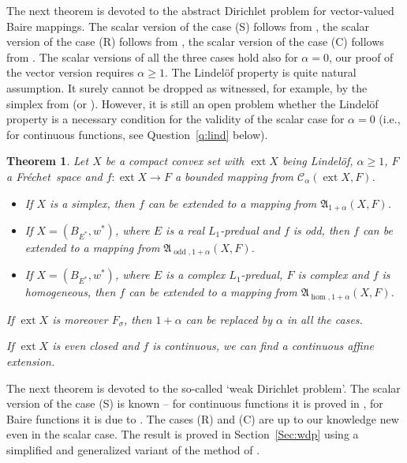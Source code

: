 \documentclass{amsart}
\numberwithin{equation}{section}
\newtheorem{thm}{Theorem}[section]
\theoremstyle{definition}
\def\fra{\mathfrak{A}}
\def\C{\mathcal C}
\def \ext {\operatorname{ext}}
\def\hom{\operatorname{hom}}
\def\odd{\operatorname{odd}}
\newcommand{\fr}{Fr\'echet\ }
\begin{document}
The next theorem is devoted to the abstract Dirichlet problem for vector-valued Baire mappings.
The scalar version of the case (S) follows from \cite{Jel}, the scalar version of the case (R) follows from \cite[Theorem 2.14]{lusp23}, the scalar version of the case (C) follows from \cite[Theorem 2.22]{lusp-complex}. The scalar versions of all the three cases hold also for $\alpha=0$, our proof of the vector version requires $\alpha\ge1$. The Lindel\"of property is quite natural assumption. It surely cannot be dropped as witnessed, for example, by the simplex from \cite[Proposition I.4.15]{alfsen} (or \cite[Example 3.82]{lmns}). However, it is still an open problem whether the Lindel\"of property is
a necessary condition for the validity of the scalar case for $\alpha=0$ (i.e., for continuous functions, see Question~\ref{q:lind} below).


\begin{thm}\label{T:dirichlet} Let $X$ be a compact convex set with $\ext X$ being Lindel\"of, $\alpha\ge 1$, $F$ a \fr space and $f:\ext X\to F$ a bounded mapping from $\C_\alpha(\ext X,F)$.
\begin{itemize}
	\item[(S)] If $X$ is a simplex, then $f$ can be extended to a mapping from $\fra_{1+\alpha}(X,F)$.
	\item[(R)] If $X=(B_{E^*},w^*)$, where $E$ is a real $L_1$-predual and $f$ is odd, then $f$ can be extended to a  mapping from $\fra_{\odd,1+\alpha}(X,F)$.
		\item[(C)] If $X=(B_{E^*},w^*)$, where $E$ is a complex $L_1$-predual, $F$ is complex and $f$ is homogeneous, then $f$ can be extended to a  mapping from $\fra_{\hom,1+\alpha}(X,F)$.
\end{itemize}

If $\ext X$ is moreover $F_\sigma$, then $1+\alpha$ can be replaced by $\alpha$ in all the cases.

If $\ext X$ is even closed and $f$ is continuous, we can find a continuous affine extension.
\end{thm}

The next theorem is devoted to the so-called `weak Dirichlet problem'. The scalar version of the case (S) is known -- for continuous functions it is proved in \cite[Theorem II.3.12]{alfsen}, for Baire functions it is due to \cite{spurny-wdp}. The cases (R) and (C) are up to our knowledge new even in the scalar case. The result is proved in Section~\ref{Sec:wdp} using a simplified and generalized variant of the method of \cite{spurny-wdp}.
\end{document}
